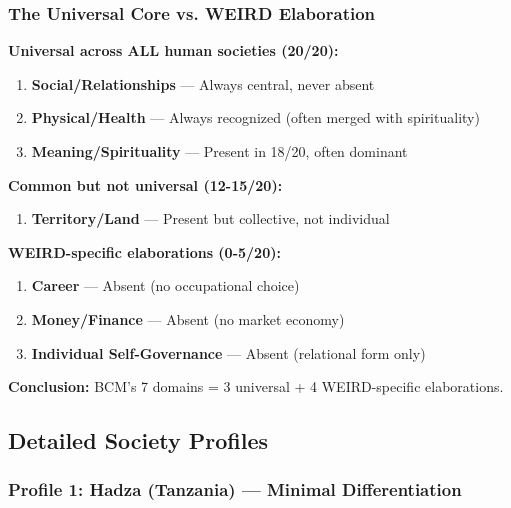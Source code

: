 \subsubsection{The Universal Core vs. WEIRD Elaboration}

\begin{tcolorbox}[colback=yellow!5!white, colframe=yellow!75!black, title=Empirical Finding: 3+1 Universal Domains]

\textbf{Universal across ALL human societies (20/20):}
\begin{enumerate}[nosep]
\item \textbf{Social/Relationships} --- Always central, never absent
\item \textbf{Physical/Health} --- Always recognized (often merged with spirituality)
\item \textbf{Meaning/Spirituality} --- Present in 18/20, often dominant
\end{enumerate}

\textbf{Common but not universal (12-15/20):}
\begin{enumerate}[nosep, start=4]
\item \textbf{Territory/Land} --- Present but collective, not individual
\end{enumerate}

\textbf{WEIRD-specific elaborations (0-5/20):}
\begin{enumerate}[nosep, start=5]
\item \textbf{Career} --- Absent (no occupational choice)
\item \textbf{Money/Finance} --- Absent (no market economy)
\item \textbf{Individual Self-Governance} --- Absent (relational form only)
\end{enumerate}

\textbf{Conclusion:} BCM's 7 domains = 3 universal + 4 WEIRD-specific elaborations.

\end{tcolorbox}

\subsection{Detailed Society Profiles}

\subsubsection{Profile 1: Hadza (Tanzania) --- Minimal Differentiation}

